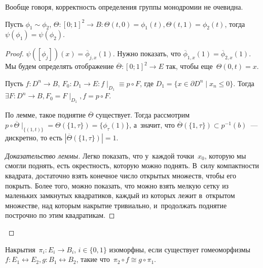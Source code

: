 \documentclass{article}
\begin{document}
Вообще говоря, корректность определения группы монодромии не очевидна.
\begin{claim}
	Пусть $\phi_1 \sim \phi_2$, $\Theta: [0; 1]^2 \rightarrow B: \Theta(t, 0) =
	\phi_1(t), \Theta(t, 1) = \phi_2(t)$, тогда $\psi(\phi_1) = \psi(\phi_2)$.
\end{claim}
\begin{proof}
	$\psi([\phi_j])(x) = \overline\phi_{j,x}(1)$. Нужно показать, что
	$\overline\phi_{1,x}(1) = \overline\phi_{2,x}(1)$. Мы будем определять
	отображение $\overline\Theta: [0; 1]^2 \rightarrow E$ так, чтобы
	еще~$\Theta(0, t) = x$.

	\begin{lemma}
		Пусть $f: D^n \rightarrow B$, $F_0: D_1 \rightarrow E: f\mid_{D_1} \equiv p
		\circ F$, где $D_1 = \{x \in \partial D^n \mid x_n \le 0\}$. Тогда $\exists
		F: D^n \rightarrow B, F_0 = F\mid_{D_1}, f = p \circ F$.
	\end{lemma}

	По лемме, такое поднятие $\overline\Theta$ существует. Тогда рассмотрим
	$p \circ \overline\Theta\mid_{\{(1,t)\}} = \Theta(\{1, \tau\}) =
	\{\phi_\tau(1)\}$, а~значит, что $\overline\Theta(\{1, \tau\}) \subset
	p^{-1}(b)$~--- дискретно, то есть $|\overline\Theta(\{1, \tau\})| = 1$.

	\begin{proof}[Доказательство леммы]
		Легко показать, что у~каждой точки~$x_0$, которую мы смогли поднять, есть
		окрестность, которую можно поднять. В~силу компактности квадрата, достаточно
		взять конечное число открытых множеств, чтобы его покрыть. Более того, можно
		показать, что можно взять мелкую сетку из маленьких замкнутых квадратиков,
		каждый из которых лежит в~открытом множестве, над которым накрытие
		тривиально, и~продолжать поднятие построчно по этим квадратикам.
	\end{proof}
\end{proof}

\begin{definition}
	Накрытия~$\pi_i: E_i \rightarrow B_i$, $i \in \{0, 1\}$ изоморфны, если
	существует гомеоморфизмы~$f: E_1 \leftrightarrow E_2, g: B_1 \leftrightarrow
	B_2$, такие что~$\pi_2 \circ f \cong g \circ \pi_1$.
\end{definition}
\end{document}
